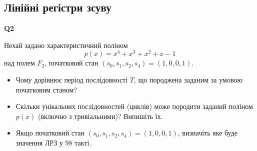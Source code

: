 \documentclass{../../test-template}
\begin{document}
\subsection{Лінійні регістри зсуву}
\begin{tcolorbox}[lowerbox=invisible,colback=white]
    \begin{minipage}{0.1\textwidth}
        \raggedright
        \vspace*{\fill}
            \textbf{Q2}
        \vspace*{\fill}
        \end{minipage}
        \begin{minipage}{0.75\textwidth}
        Нехай задано характеристичний поліном $$p(x)=x^4+x^3+x^2+x-1$$ над полем $F_2$, початковий стан $(s_0,s_1,s_2,s_4)=(1,0,0,1)$.
        \begin{itemize}
            \item Чому дорівнює період послідовності $T$, що породжена заданим за умовою початковим станом?
            \item Скільки унікальних послідовностей (циклів) може породити заданий поліном $p(x)$ (включно з тривіальними)? Випишіть їх.
            \item Якщо початковий стан $(s_0,s_1,s_2,s_4)=(1,0,0,1)$, визначіть яке буде значення ЛРЗ у 98 такті.
        \end{itemize}
        \end{minipage}
\end{tcolorbox}
\end{document}
